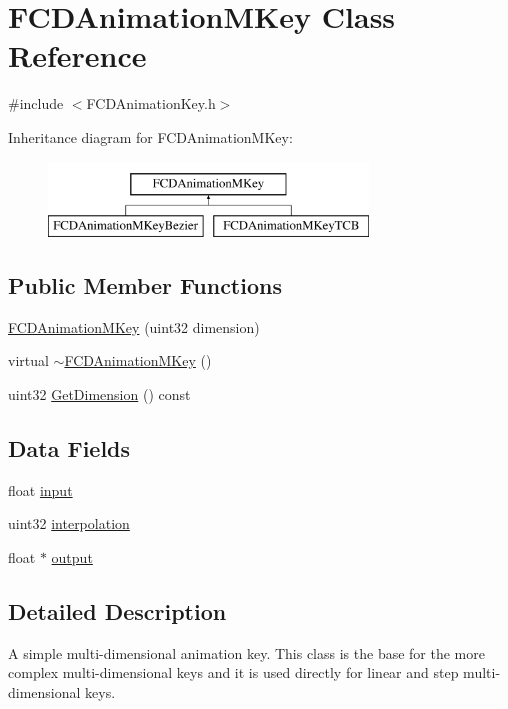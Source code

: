 \hypertarget{classFCDAnimationMKey}{
\section{FCDAnimationMKey Class Reference}
\label{classFCDAnimationMKey}
}


{\ttfamily \#include $<$FCDAnimationKey.h$>$}

Inheritance diagram for FCDAnimationMKey:\begin{figure}[H]
\begin{center}
\leavevmode
\includegraphics[height=2.000000cm]{classFCDAnimationMKey}
\end{center}
\end{figure}
\subsection*{Public Member Functions}
\begin{DoxyCompactItemize}
\item 
\hyperlink{classFCDAnimationMKey_a47f7144948d1042b187492722c2db4ae}{FCDAnimationMKey} (uint32 dimension)
\item 
virtual \hyperlink{classFCDAnimationMKey_aa0372888809476aee77140e315df5141}{$\sim$FCDAnimationMKey} ()
\item 
uint32 \hyperlink{classFCDAnimationMKey_ab1effabe7abcc46821442b88f7c459ba}{GetDimension} () const 
\end{DoxyCompactItemize}
\subsection*{Data Fields}
\begin{DoxyCompactItemize}
\item 
float \hyperlink{classFCDAnimationMKey_a23e2a29dcce4b317979da21ec48f8e68}{input}
\item 
uint32 \hyperlink{classFCDAnimationMKey_afde626bbddacb9897d80a6158f1a8e2a}{interpolation}
\item 
float $\ast$ \hyperlink{classFCDAnimationMKey_a44bfaf4f29f3946f9a3ffe0db81828cb}{output}
\end{DoxyCompactItemize}


\subsection{Detailed Description}
A simple multi-\/dimensional animation key. This class is the base for the more complex multi-\/dimensional keys and it is used directly for linear and step multi-\/dimensional keys. 

